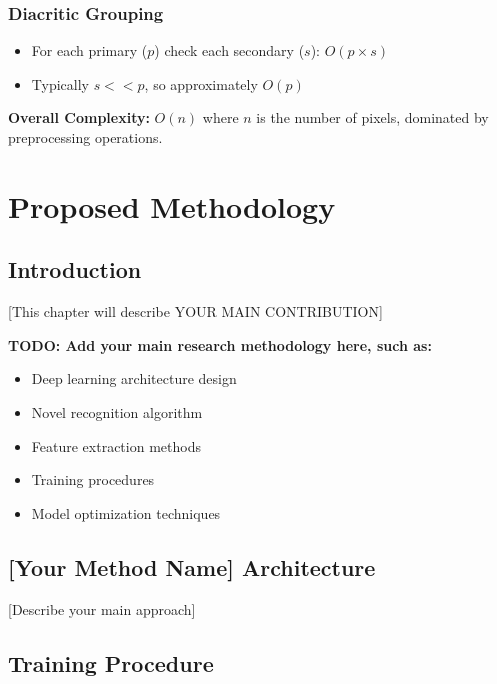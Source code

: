 \documentclass[12pt,a4paper,oneside]{report}
\begin{document}
\subsection{Diacritic Grouping}
\begin{itemize}
    \item For each primary ($p$) check each secondary ($s$): $O(p \times s)$
    \item Typically $s << p$, so approximately $O(p)$
\end{itemize}

\textbf{Overall Complexity:} $O(n)$ where $n$ is the number of pixels, dominated by preprocessing operations.

\chapter{Proposed Methodology}

\section{Introduction}

[This chapter will describe YOUR MAIN CONTRIBUTION]

\textbf{TODO: Add your main research methodology here, such as:}
\begin{itemize}
    \item Deep learning architecture design
    \item Novel recognition algorithm
    \item Feature extraction methods
    \item Training procedures
    \item Model optimization techniques
\end{itemize}

\section{[Your Method Name] Architecture}

[Describe your main approach]

\section{Training Procedure}
\end{document}
